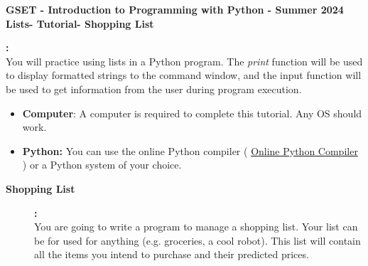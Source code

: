 \documentclass[12pt]{article}
\newcommand{\MNUM}{4} %
\newcommand{\MNAME}{Lists} %
\newcommand{\TNAME}{Shopping List} %
\newcommand{\SEM}{Summer 2024}
\begin{document}
\thispagestyle{plain}

\begin{center}
   {\bf \large GSET - Introduction to Programming with Python - \SEM} \vspace{5mm}\\
   {\bf \Large \MNAME \hspc -  Tutorial\hspc\MNUM\hspc - \TNAME}\vspace{3mm}\\
   
\end{center}


\begin{description}[labelindent=1cm]
	
			\item [\textbf{ \Large Overview}] \textbf{ \Large :}\\
			You will practice using lists in a Python program. The {\it print} function will be used to display formatted strings to the command window, and the input function will be used to get information from the user during program execution. \\
 	
	\item[\textbf{\underline{System Requirements:}}] \hfill \vspace{0mm}

\begin{itemize}
	\item {\bf Computer}: A computer is required to complete this tutorial. Any OS should work.
	\item {\bf Python:} You can use the online Python compiler ( \href{https://www.online-python.com/online_python_compiler}{Online Python Compiler}  ) or a Python system of your choice.
\end{itemize}

	\item[\textbf{\underline{Background:}}] \hfill \vspace{0mm}
	
	\begin{description}

	 	\item [\textbf{Shopping List }] \textbf{ \Large :}\\   
            You are going to write a program to manage a shopping list. Your list can be for used for anything (e.g. groceries, a cool robot). This list will contain all the items you intend to purchase and their predicted prices.
            

\end{description}
\end{description}
\end{document}
